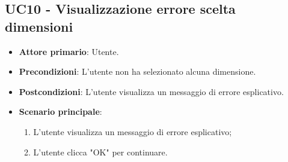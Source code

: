 \subsection{UC10 - Visualizzazione errore scelta dimensioni}
\begin{itemize}
	\item \textbf{Attore primario}: Utente.
	\item \textbf{Precondizioni}: L'utente non ha selezionato alcuna dimensione.
	\item \textbf{Postcondizioni}: L'utente visualizza un messaggio di errore esplicativo.
	\item \textbf{Scenario principale}:
		\begin{enumerate}
			\item L'utente visualizza un messaggio di errore esplicativo;
			\item L'utente clicca "OK" per continuare.
		\end{enumerate}
\end{itemize}